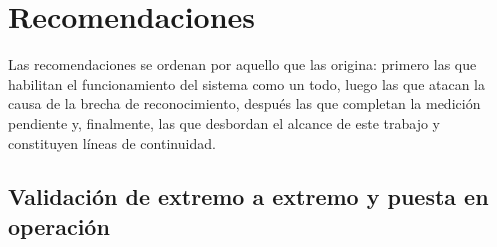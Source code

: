 \section{Recomendaciones}

Las recomendaciones se ordenan por aquello que las origina: primero las que
habilitan el funcionamiento del sistema como un todo, luego las que atacan la
causa de la brecha de reconocimiento, después las que completan la medición
pendiente y, finalmente, las que desbordan el alcance de este trabajo y
constituyen líneas de continuidad.

\subsection{Validación de extremo a extremo y puesta en operación}

